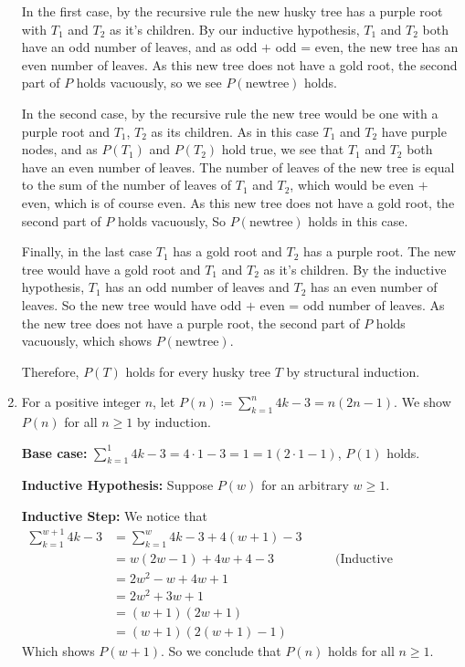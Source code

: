 \documentclass[12pt]{article}
\theoremstyle{definition}
\theoremstyle{remark}
\newcommand{\justif}[1]{&\quad &\text{(#1)}}
\begin{document}
\begin{enumerate}[leftmargin=\labelsep]
		In the first case, by the recursive rule the new husky tree has a purple root with $T_1$ and $T_2$ as it's children. By our inductive hypothesis, $T_1$ and $T_2$ both have an odd number of leaves, and as odd $+$ odd = even, the new tree has an even number of leaves. As this new tree does not have a gold root, the second part of $P$ holds vacuously, so we see $P(\mathrm{new tree})$ holds.
		
		In the second case, by the recursive rule the new tree would be one with a purple root and $T_1$, $T_2$ as its children. As in this case $T_1$ and $T_2$ have purple nodes, and as $P(T_1)$ and $P(T_2)$ hold true, we see that $T_1$ and $T_2$ both have an even number of leaves. The number of leaves of the new tree is equal to the sum of the number of leaves of $T_1$ and $T_2$, which would be even $+$ even, which is of course even. As this new tree does not have a gold root, the second part of $P$ holds vacuously, So $P(\mathrm{new tree})$ holds in this case.
		
		Finally, in the last case $T_1$ has a gold root and $T_2$ has a purple root. The new tree would have a gold root and $T_1$ and $T_2$ as it's children. By the inductive hypothesis, $T_1$ has an odd number of leaves and $T_2$ has an even number of leaves. So the new tree would have odd $+$ even = odd number of leaves. As the new tree does not have a purple root, the second part of $P$ holds vacuously, which shows $P(\mathrm{new tree})$. 
		
		Therefore, $P(T)$ holds for every husky tree $T$ by structural induction.
		
		\item For a positive integer $n$, let $P(n) \coloneq \sum_{k=1}^n 4k-3 = n(2n-1)$. We show $P(n)$ for all $n \geq 1$ by induction.
		
		\textbf{Base case:} $\sum_{k=1}^1 4k-3 = 4\cdot 1 - 3 = 1 = 1(2 \cdot 1 - 1)$, $P(1)$ holds.
		
		\textbf{Inductive Hypothesis:} Suppose $P(w)$ for an arbitrary $w \geq 1$. 
		
		\textbf{Inductive Step:} We notice that
		\begin{align*}
			\sum_{k=1}^{w+1} 4k-3 &= \sum_{k=1}^w 4k-3 + 4(w+1)-3 \\
			&= w(2w-1) + 4w+4 - 3 \justif{Inductive Hypothesis} \\
			&= 2w^2 - w + 4w + 1 \\
			&= 2w^2 + 3w + 1 \\
			&= (w+1)(2w+1) \\
			&= (w+1)(2(w+1) - 1)
		\end{align*}
		Which shows $P(w+1)$. So we conclude that $P(n)$ holds for all $n \geq 1$.
	\end{enumerate}
\end{document}
